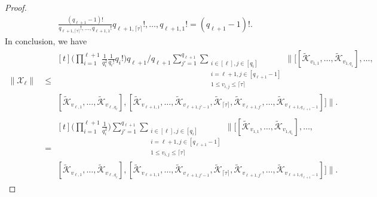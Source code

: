 \documentclass[11pt]{article}
\newcommand{\mc}{\mathcal}
\begin{document}
\begin{proof}
\begin{align*}
    \frac{(q_{\ell+1}-1)!}{q_{\ell+1,\lceil \tau \rceil}!, \ldots, q_{\ell+1,1}!}q_{\ell+1,\lceil \tau \rceil}!, \ldots, q_{\ell+1,1}! = (q_{\ell+1}-1)!.
\end{align*}
In conclusion, we have \begin{align*}
    \|\mc X_\ell\|&\le \begin{multlined}[t]
        \bigg(\prod_{i=1}^{\ell+1} \frac{1}{q_i^2}\frac{1}{q_i!}q_i!\bigg)q_{\ell+1}/q_{\ell+1}\sum_{j'=1}^{q_{\ell+1}} \sum_{\substack{
            i\in[\ell], j\in[q_i] \\
            i=\ell+1, j\in[q_{\ell+1}-1] \\
            1\le v_{i,j} \le \lceil\tau\rceil
        }} \bigg\| \Big[ 
            [\tilde{\mc K}_{v_{1,1}}, \ldots, \tilde{\mc K}_{v_{1,q_1}}], \ldots, \\ 
             [\tilde{\mc K}_{v_{\ell,1}}, \ldots, \tilde{\mc K}_{v_{\ell,q_\ell}}], 
            [\tilde{\mc K}_{v_{\ell+1,1}}, \ldots, \tilde{\mc K}_{v_{\ell+1,j'-1}},\tilde{\mc K}_{\lceil\tau\rceil},\tilde{\mc K}_{v_{\ell+1,j'}}, \ldots, \tilde{\mc K}_{v_{\ell+1,q_{\ell+1}-1}}]
            \Big] \bigg\|.
    \end{multlined}\\
    &=\begin{multlined}[t]\bigg(\prod_{i=1}^{\ell+1} \frac{1}{q_i^2}\bigg)
        \sum_{j'=1}^{q_{\ell+1}} \sum_{\substack{
            i\in[\ell], j\in[q_i] \\
            i=\ell+1, j\in[q_{\ell+1}-1] \\
            1\le v_{i,j} \le \lceil\tau\rceil
        }} \bigg\| \Big[ 
            [\tilde{\mc K}_{v_{1,1}}, \ldots, \tilde{\mc K}_{v_{1,q_1}}], \ldots, \\ 
             [\tilde{\mc K}_{v_{\ell,1}}, \ldots, \tilde{\mc K}_{v_{\ell,q_\ell}}], 
            [\tilde{\mc K}_{v_{\ell+1,1}}, \ldots, \tilde{\mc K}_{v_{\ell+1,j'-1}},\tilde{\mc K}_{\lceil\tau\rceil},\tilde{\mc K}_{v_{\ell+1,j'}}, \ldots, \tilde{\mc K}_{v_{\ell+1,q_{\ell+1}-1}}]
            \Big] \bigg\|.
    \end{multlined}
\end{align*}
\end{proof}
\end{document}
